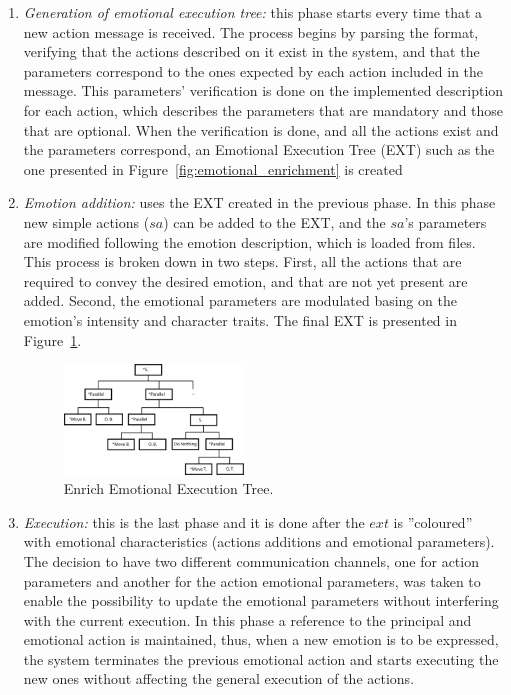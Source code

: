 \begin{enumerate}
	\item \textit{Generation of emotional execution tree:} this phase starts every time that a new action message is received. The process begins by parsing the format, verifying that the actions described on it exist in the system, and that the parameters correspond to the ones expected by each action included in the message. This parameters' verification is done on the implemented description for each action, which describes the parameters that are mandatory and those that are optional. %
When the verification is done, and all the actions exist and the parameters correspond, an Emotional Execution Tree (EXT) such as the one presented in Figure~\ref{fig:emotional_enrichment} is created
	\item \textit{Emotion addition:} uses the EXT created in the previous phase. In this phase new simple actions ($sa$)
can be added to the EXT, and the $sa$'s parameters are modified following the emotion description, which is loaded from files. This process is broken down in two steps. First, all the actions that are required to convey the desired emotion, and that are not yet present are added. Second, the emotional parameters are modulated basing on the emotion's intensity and character traits. The final EXT is presented in Figure~\ref{fig:reference}.
	\begin{figure}
		\centering
	\includegraphics[width=0.45\textwidth]{./Images/exampleTreeE.png}
	\caption{Enrich Emotional Execution Tree.} 
	\label{fig:reference}
	\end{figure}
	\item \textit{Execution:} this is the last phase and it is done after the $ext$ is ''coloured'' with emotional characteristics (actions additions and emotional parameters). The decision to have two different communication channels, one for action parameters and another for the action emotional parameters, was taken to enable the possibility to update the emotional parameters without interfering with the current execution. In this phase a reference to the principal and emotional action is maintained, thus, when a new emotion is to be expressed, the system terminates the previous emotional action and starts executing the new ones without affecting the general execution of the actions. %
\end{enumerate}

